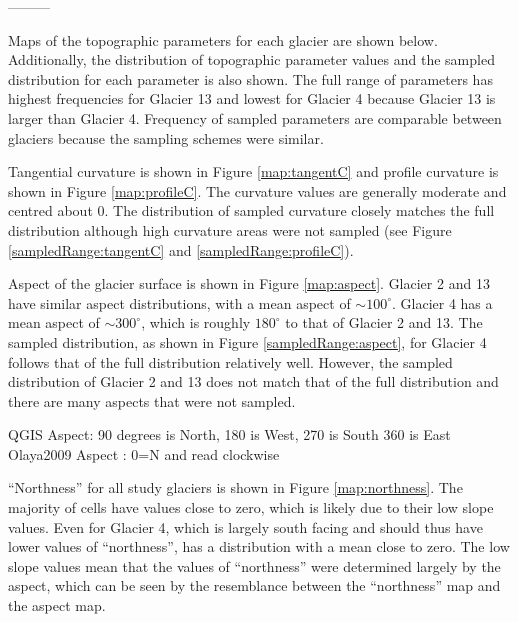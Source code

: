 \documentclass[12pt]{article}
\begin{document}
---------

Maps of the topographic parameters for each glacier are shown below. Additionally, the distribution of topographic parameter values and the sampled distribution for each parameter is also shown. The full range of parameters has highest frequencies for Glacier 13 and lowest for Glacier 4 because Glacier 13 is larger than Glacier 4. Frequency of sampled parameters are comparable between glaciers because the sampling schemes were similar.

 




Tangential curvature is shown in Figure \ref{map:tangentC} and profile curvature is shown in Figure \ref{map:profileC}. The curvature values are generally moderate and centred about 0. The distribution of sampled curvature closely matches the full distribution although high curvature areas were not sampled (see Figure \ref{sampledRange:tangentC} and \ref{sampledRange:profileC}).


Aspect of the glacier surface is shown in Figure \ref{map:aspect}. Glacier 2 and 13 have similar aspect distributions, with a mean aspect of $\sim100^{\circ}$. Glacier 4 has a mean aspect of $\sim300^{\circ}$, which is roughly $180^{\circ}$ to that of Glacier 2 and 13. The sampled distribution, as shown in Figure \ref{sampledRange:aspect}, for Glacier 4 follows that of the full distribution relatively well. However, the sampled distribution of Glacier 2 and 13 does not match that of the full distribution and there are many aspects that were not sampled.  


QGIS Aspect: 90 degrees is North, 180 is West, 270 is South 360 is East
Olaya2009 Aspect : 0=N and read clockwise

``Northness'' for all study glaciers is shown in Figure \ref{map:northness}. The majority of cells have values close to zero, which is likely due to their low slope values. Even for Glacier 4, which is largely south facing and should thus have lower values of ``northness'', has a distribution with a mean close to zero. The low slope values mean that the values of ``northness'' were determined largely by the aspect, which can be seen by the resemblance between the ``northness'' map and the aspect map. 
\end{document}
